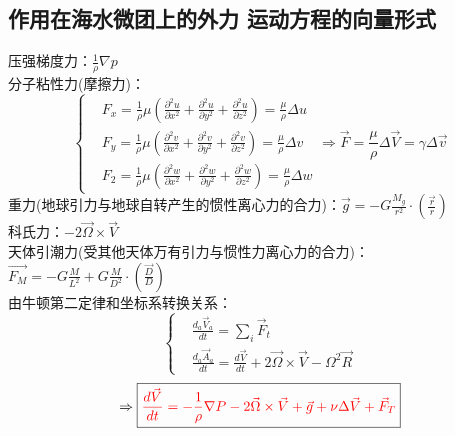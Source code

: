 \documentclass[a4paper,12pt]{article}
\begin{document}
    \subsection{作用在海水微团上的外力 运动方程的向量形式}
    压强梯度力：$\displaystyle\frac{1}{\rho}\nabla p$\\
    分子粘性力(摩擦力)：
    \[
        \left\{
        \begin{aligned}
            &F_{x}=\frac{1}{\rho} \mu\left(\frac{\partial^{2} u}{\partial x^{2}}+\frac{\partial^{2} u}{\partial y^{2}}+\frac{\partial^{2} u}{\partial z^{2}}\right)=\frac{\mu}{\rho} \Delta u\\
            &F_{y}=\frac{1}{\rho} \mu\left(\frac{\partial^{2} v}{\partial x^{2}}+\frac{\partial^{2} v}{\partial y^{2}}+\frac{\partial^{2} v}{\partial z^{2}}\right)=\frac{\mu}{\rho} \Delta v\\
            &F_{2}=\frac{1}{\rho} \mu\left(\frac{\partial^{2} w}{\partial x^{2}}+\frac{\partial^{2} w}{\partial y^{2}}+\frac{\partial^{2} w}{\partial z^{2}}\right)=\frac{\mu}{\rho} \Delta w
        \end{aligned}
        \right.
        \Rightarrow \vec{F}=\frac{\mu}{\rho}\Delta \vec{V}=\gamma\Delta\vec{v}
    \]
    重力(地球引力与地球自转产生的惯性离心力的合力)：$\displaystyle\vec{g}=-G\frac{M_g}{r^2}\cdot\left(\frac{\vec{r}}{r}\right)$\\
    科氏力：$\displaystyle -2\vec{\Omega}\times\vec{V}$\\
    天体引潮力(受其他天体万有引力与惯性力离心力的合力)：$\displaystyle\vec{F_M}=-G\frac{M}{L^2}+G\frac{M}{D^2}\cdot\left(\frac{\vec{D}}{D}\right)$\\
    由牛顿第二定律和坐标系转换关系：
    \[
        \left\{
        \begin{aligned}
            &\frac{d_{a} \vec{V}_{a}}{d t}=\sum_{i} \vec{F}_{t}\\
            &\frac{d_{a} \vec{A}_{a}}{d t}=\frac{d \vec{V}}{d t}+2 \vec{\Omega} \times \vec{V}-\Omega^{2} \vec{R}
        \end{aligned}
        \right.
    \]
    \[
        \Rightarrow\boxed{\color{red} \frac{d \vec{V}}{d t}=-\frac{1}{\rho} \nabla P-2 \vec{\Omega} \times \vec{V}+\vec{g} +\nu \Delta \vec{V}+\vec{F}_{T}}
    \]
\end{document}
